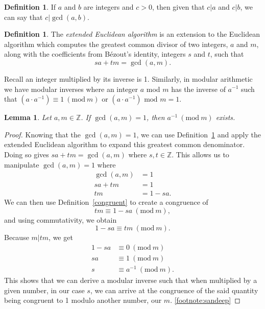\documentclass[12pt,a4paper,reqno,parskip=full]{amsart}
\numberwithin{equation}{section}
\theoremstyle{plain}
\newtheorem{lemma}[subsection]{Lemma}
\theoremstyle{definition}
\newtheorem{definition}[subsection]{Definition}
\newcommand{\Mod}[1]{\ (\mathrm{mod}\ #1)}
\def\Z{{\mathbb Z}}
\begin{document}
\begin{definition}\label{2.3}
	If $a$ and $b$ are integers and $c>0$, then given that $c|a$ and $c|b$, we can say that $c|\gcd(a,b)$.
\end{definition}

\begin{definition}\label{extended-algo}
	The \textit{extended Euclidean algorithm} is an extension to the Euclidean algorithm which computes the greatest common divisor of two integers, $a$ and $m$, along with the coefficients from Bézout's identity, integers $s$ and $t$, such that $$sa+tm=\gcd(a,m).$$	\cite{extended}
\end{definition}

Recall an integer multiplied by its inverse is 1. Similarly, in modular arithmetic we have modular inverses where an integer $a$ mod $m$ has the inverse of $a^{-1}$ such that $(a \cdot a^{-1}) \equiv 1 \Mod{m}$ or $(a \cdot a^{-1}) \text{ mod } m = 1$\cite{Khan}.

\begin{lemma}\label{inverse}
	Let $a,m \in \Z$. If $\gcd(a,m) = 1$, then $a^{-1}\Mod{m}$ exists.
	\cite{sandeep}
\end{lemma}

\begin{proof}
	Knowing that the $\gcd(a,m) = 1$, we can use Definition~\ref{extended-algo} and apply the extended Euclidean algorithm to expand this greatest common denominator. Doing so gives $sa+tm=\gcd(a,m)$ where $s,t \in \Z$. This allows us to manipulate $\gcd(a,m)=1$ where
	\begin{align*}
		\gcd(a,m)&=1 \\
		sa+tm &= 1\\
		tm &= 1-sa.
	\end{align*}
	We can then use Definition~\ref{congruent} to create a congruence of $$tm \equiv 1-sa \Mod{m},$$ and using commutativity, we obtain $$1-sa \equiv tm \Mod{m}.$$ Because $m|tm$, we get
	\begin{align*}
		1-sa &\equiv 0 \Mod{m}\\
		sa &\equiv 1 \Mod{m}\\
		s &\equiv a^{-1}\Mod{m}.
	\end{align*}
	This shows that we can derive a modular inverse such that when multiplied by a given number, in our case $s$, we can arrive at the congruence of the said quantity being congruent to 1 modulo another number, our $m$.
	\ref{footnote:sandeep}			
\end{proof}
\end{document}
